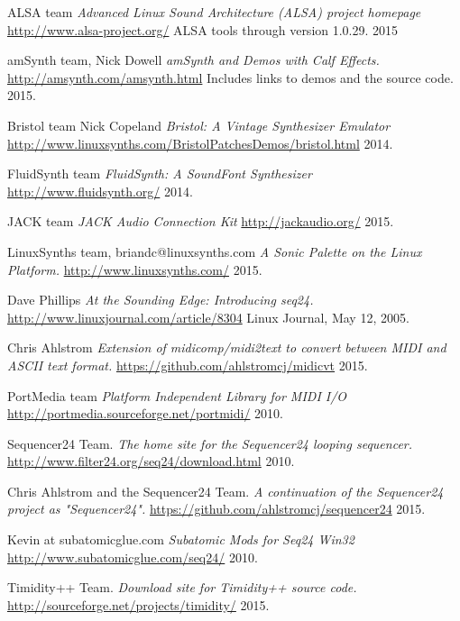 \begin{thebibliography}{99}

   ALSA team
   \emph{Advanced Linux Sound Architecture (ALSA) project homepage}
   \url{http://www.alsa-project.org/}
   ALSA tools through version 1.0.29.
   2015

   amSynth team, Nick Dowell
   \emph{amSynth and Demos with Calf Effects.}
   \url{http://amsynth.com/amsynth.html}
   Includes links to demos and the source code.
   2015.

   Bristol team Nick Copeland
   \emph{Bristol: A Vintage Synthesizer Emulator}
   \url{http://www.linuxsynths.com/BristolPatchesDemos/bristol.html}
   2014.

   FluidSynth team
   \emph{FluidSynth: A SoundFont Synthesizer}
   \url{http://www.fluidsynth.org/}
   2014.

   JACK team
   \emph{JACK Audio Connection Kit}
   \url{http://jackaudio.org/}
   2015.

   LinuxSynths team, briandc@linuxsynths.com
   \emph{A Sonic Palette on the Linux Platform.}
   \url{http://www.linuxsynths.com/}
   2015.

   Dave Phillips
   \emph{At the Sounding Edge: Introducing seq24.}
   \url{http://www.linuxjournal.com/article/8304}
   Linux Journal, May 12, 2005.

   Chris Ahlstrom
   \emph{Extension of midicomp/midi2text to convert between MIDI and ASCII
      text format.}
   \url{https://github.com/ahlstromcj/midicvt}
   2015.

   PortMedia team
   \emph{Platform Independent Library for MIDI I/O}
   \url{http://portmedia.sourceforge.net/portmidi/}
   2010.

   Sequencer24 Team.
   \emph{The home site for the Sequencer24 looping sequencer.}
   \url{http://www.filter24.org/seq24/download.html}
   2010.

   Chris Ahlstrom and the Sequencer24 Team.
   \emph{A continuation of the Sequencer24 project as "Sequencer24".}
   \url{https://github.com/ahlstromcj/sequencer24}
   2015.

   Kevin at subatomicglue.com
   \emph{Subatomic Mods for Seq24 Win32}
   \url{http://www.subatomicglue.com/seq24/}
   2010.

   Timidity++ Team.
   \emph{Download site for Timidity++ source code.}
   \url{http://sourceforge.net/projects/timidity/}
   2015.


\end{thebibliography}
